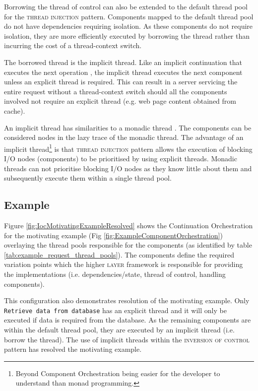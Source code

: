 \documentclass[prodmode]{style/acmlarge}
\begin{document}
Borrowing the thread of control can also be extended to the default thread pool
for the \textsc{thread injection} pattern.  Components mapped to the default
thread pool do not have dependencies requiring isolation.  As these components
do not require isolation, they are more efficiently executed by borrowing the
thread rather than incurring the cost of a thread-context switch.

The borrowed thread is the implicit thread.  Like an implicit continuation that
executes the next operation \cite{continuations}, the implicit thread executes
the next component unless an explicit thread is required.  This can result in
a server servicing the entire request without a thread-context switch
should all the components involved not require an explicit thread
(e.g. web page content obtained from cache).

An implicit thread has similarities to a monadic thread \cite{monadic-thread}.
The components can be considered nodes in the lazy trace of the monadic thread.
The advantage of an implicit thread\footnote{Beyond Component Orchestration
being easier for the developer to understand than monad programming.} is that
\textsc{thread injection} pattern allows the execution of blocking I/O nodes
(components) to be prioritised by using explicit threads.  Monadic threads can
not prioritise blocking I/O nodes as they know little about them and
subsequently execute them within a single thread pool.


\subsection{Example}

Figure \ref{fig:IocMotivatingExampleResolved} shows the Continuation
Orchestration for the motivating example (Fig
\ref{fig:ExampleComponentOrchestration}) overlaying the thread pools responsible
for the components (as identified by table
\ref{tab:example_request_thread_pools}).  The components define the required
variation points which the higher \textsc{layer} framework is responsible for
providing the implementations (i.e. dependencies/state, thread of control,
handling components).

This configuration also demonstrates resolution of the motivating example.  Only
\texttt{Retrieve data from database} has an explicit thread and it will only be
executed if data is required from the database.  As the remaining components are
within the default thread pool, they are executed by an implicit thread (i.e.
borrow the thread).  The use of implicit threads within the \textsc{inversion of
control} pattern has resolved the motivating example.
\end{document}
